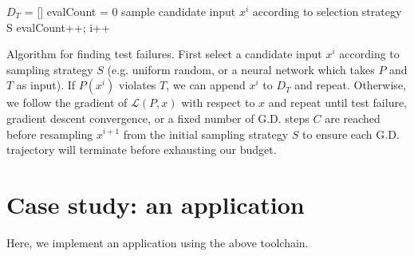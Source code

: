 \documentclass[12pt,initial,twoside,maitrise]{dms}
\numberwithin{equation}{section}
\numberwithin{table}{chapter}
\numberwithin{figure}{chapter}
\begin{document}
    \begin{algorithm}

        $D_T$ = []\;
        evalCount = 0\;
         {
        sample candidate input $x^i$ according to selection strategy S\;
        evalCount++; i++\;
        }


        \caption{Algorithm for finding test failures. First select a candidate input $x^i$ according to sampling strategy $S$ (e.g. uniform random, or a neural network which takes $P$ and $T$ as input). If $P(x^i)$ violates $T$, we can append $x^i$ to $D_T$ and repeat. Otherwise, we follow the gradient of $\mathcal{L}(P, x)$ with respect to $x$ and repeat until test failure, gradient descent convergence, or a fixed number of G.D. steps $C$ are reached before resampling $x^{i+1}$ from the initial sampling strategy $S$ to ensure each G.D. trajectory will terminate before exhausting our budget.}
    \end{algorithm}

    \chapter*{Case study: an application}

    Here, we implement an application using the above toolchain.
\end{document}
